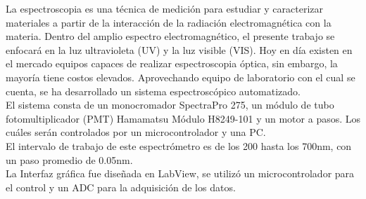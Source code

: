 \tableofcontents
\listoffigures
\listoftables
{}
La espectroscopia es una técnica de medición para estudiar y caracterizar materiales a partir de la interacción de la radiación electromagnética con la materia.
Dentro del amplio espectro electromagnético, el presente trabajo se enfocará en la luz ultravioleta (UV) y la luz visible (VIS). Hoy en día existen en el mercado equipos capaces de realizar espectroscopia óptica, sin embargo, la mayoría tiene costos elevados. Aprovechando equipo de laboratorio con el cual se cuenta, se ha desarrollado un sistema espectroscópico automatizado. \\
El sistema consta de un monocromador SpectraPro 275, un módulo de tubo fotomultiplicador (PMT) Hamamatsu Módulo H8249-101 y un motor a pasos. Los cuáles serán controlados por un microcontrolador y una PC.\\
El intervalo de trabajo de este espectrómetro es de los 200 hasta los 700nm, con un paso promedio de 0.05nm. \\
La Interfaz gráfica fue diseñada en LabView, se utilizó un microcontrolador para el control y un ADC para la adquisición de los datos.
